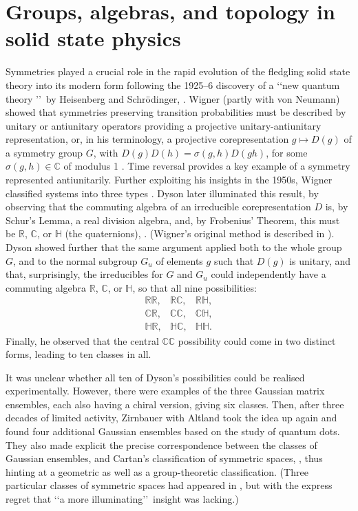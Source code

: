 \documentclass[11pt]{article}
\newcommand{\real}{{\mathbb R}}
\newcommand{\complex}{{\mathbb C}}
\newcommand{\quat}{{\mathbb H}}
\begin{document}
\section{Groups, algebras, and topology in solid state physics}

Symmetries played a crucial role in the rapid evolution of the fledgling solid state theory into its modern form following the 1925--6 discovery of a \lq\lq new quantum theory \rq\rq\ by Heisenberg and Schr\"odinger, \cite{Blo,W27,W28}. Wigner (partly with von Neumann) showed that symmetries preserving transition probabilities must be described by unitary or antiunitary operators providing a projective unitary-antiunitary representation, or, in his terminology, a projective corepresentation $g\mapsto D(g)$ of a symmetry group $G$, with  $D(g)D(h) = \sigma(g,h)D(gh)$, for some $\sigma(g,h) \in \complex$ of modulus 1 \cite{vNW, W59}. Time reversal provides a key example of a symmetry represented antiunitarily.
Further exploiting his insights in the 1950s,  Wigner classified systems into three types \cite{W55,W57,W58}.
Dyson later illuminated this result, by observing that the commuting algebra of an irreducible corepresentation $D$ is, by Schur's Lemma, a real division algebra, and, by Frobenius'  Theorem, this must be $\real$, $\complex$, or $\quat$ (the quaternions),  \cite{D62}. (Wigner's original method  is described in \cite[\S26]{W59}).
Dyson showed further that the same argument applied both to the whole group $G$, and to the normal subgroup $G_u$ of elements $g$ such that $D(g)$ is unitary, and that,  surprisingly, the irreducibles for $G$ and $G_u$ could independently have a commuting algebra $\real$, $\complex$, or $\quat$, so that all nine possibilities:
\begin{eqnarray*}
\real\real, &\real\complex,&\real\quat,\\
\complex\real, &\complex\complex, &\complex\quat,\\
\quat\real,&\quat\complex,&\quat\quat.
\end{eqnarray*}
Finally, he observed that the central $\complex\complex$ possibility could come in two distinct forms, leading to ten classes in all.

It was unclear whether all  ten of Dyson's possibilities could be realised experimentally. However,  there were examples of the three Gaussian matrix ensembles, each also having a chiral version, giving six classes. Then, after three decades of limited activity, Zirnbauer \cite{Z96} with Altland \cite{AZ95,AZ96}  took the idea up again and found four additional Gaussian ensembles based on the study of quantum dots. They also made explicit the precise correspondence between the classes of Gaussian ensembles, and Cartan's classification of symmetric spaces, \cite{Z96,AZ96}, thus hinting at a geometric as well as a group-theoretic classification.
(Three particular classes of  symmetric spaces had appeared in \cite[\S V]{D70}, but with the express regret that \lq\lq a more illuminating\rq\rq\  insight was lacking.)
\end{document}
